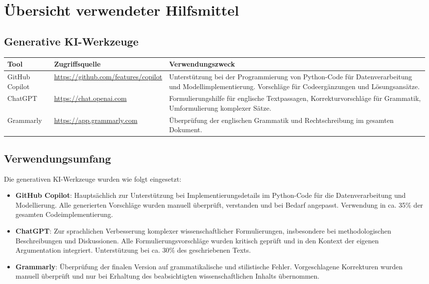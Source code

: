 \chapter*{Übersicht verwendeter Hilfsmittel}
\thispagestyle{plain}

\section*{Generative KI-Werkzeuge}

\begin{tabular}{p{3cm}p{5cm}p{7cm}}
  \textbf{Tool}  & \textbf{Zugriffsquelle}                   & \textbf{Verwendungszweck}                                                                   \\
  \hline
  GitHub Copilot & \url{https://github.com/features/copilot} &
  Unterstützung bei der Programmierung von Python-Code für Datenverarbeitung und Modellimplementierung. Vorschläge für Codeergänzungen und Lösungsansätze. \\
  \hline
  ChatGPT        & \url{https://chat.openai.com}             &
  Formulierungshilfe für englische Textpassagen, Korrekturvorschläge für Grammatik, Umformulierung komplexer Sätze.                                        \\
  \hline
  Grammarly      & \url{https://app.grammarly.com}           &
  Überprüfung der englischen Grammatik und Rechtschreibung im gesamten Dokument.                                                                           \\
  \hline
\end{tabular}

\section*{Verwendungsumfang}

Die generativen KI-Werkzeuge wurden wie folgt eingesetzt:

\begin{itemize}
  \item \textbf{GitHub Copilot}: Hauptsächlich zur Unterstützung bei Implementierungsdetails im Python-Code für die Datenverarbeitung und Modellierung. Alle generierten Vorschläge wurden manuell überprüft, verstanden und bei Bedarf angepasst. Verwendung in ca. 35\% der gesamten Codeimplementierung.

  \item \textbf{ChatGPT}: Zur sprachlichen Verbesserung komplexer wissenschaftlicher Formulierungen, insbesondere bei methodologischen Beschreibungen und Diskussionen. Alle Formulierungsvorschläge wurden kritisch geprüft und in den Kontext der eigenen Argumentation integriert. Unterstützung bei ca. 30\% des geschriebenen Texts.

  \item \textbf{Grammarly}: Überprüfung der finalen Version auf grammatikalische und stilistische Fehler. Vorgeschlagene Korrekturen wurden manuell überprüft und nur bei Erhaltung des beabsichtigten wissenschaftlichen Inhalts übernommen.
\end{itemize}

